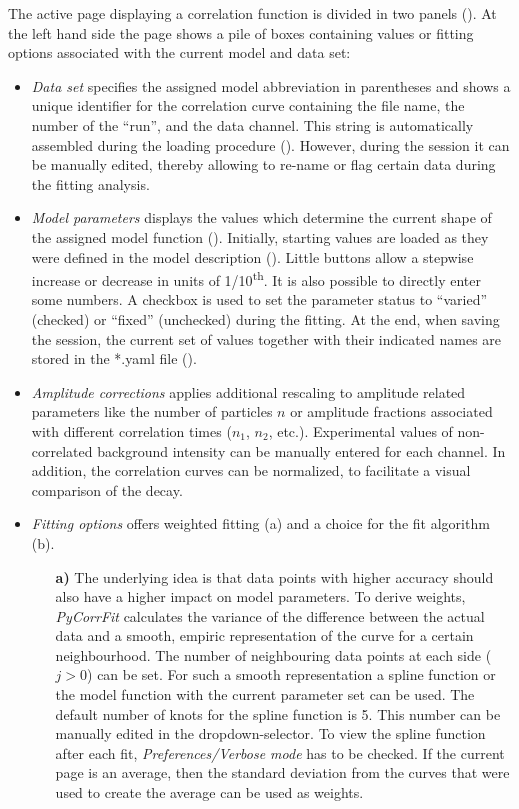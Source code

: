 The active page displaying a correlation function is divided in two panels (). At the left hand side the page shows a pile of boxes containing values or fitting options associated with the current model and data set: 

\begin{itemize}
\item \textit{Data set} specifies the assigned model abbreviation in parentheses and shows a unique identifier for the correlation curve containing the file name, the number of the ``run'', and the data channel. This string is automatically assembled during the loading procedure (). However, during the session it can be manually edited, thereby allowing to re-name or flag certain data during the fitting analysis.
\item \textit{Model parameters} displays the values which determine the current shape of the assigned model function (). Initially, starting values are loaded as they were defined in the model description (). Little buttons allow a stepwise increase or decrease in units of 1/10\textsuperscript{th}. It is also possible to directly enter some numbers. A checkbox is used to set the parameter status to ``varied'' (checked) or ``fixed'' (unchecked) during the fitting. At the end, when saving the session, the current set of values together with their indicated names are stored in the *.yaml file (). 
\item \textit{Amplitude corrections} applies additional rescaling to amplitude related parameters like the number of particles $n$ or amplitude fractions associated with different correlation times ($n_1$, $n_2$, etc.). Experimental values of non-correlated background intensity can be manually entered for each channel. In addition, the correlation curves can be normalized, to facilitate a visual comparison of the decay.
\item \textit{Fitting options} offers weighted fitting (a) and a choice for the fit algorithm (b).
\begin{itemize}
\item[\textbf{a)}] The underlying idea is that data points with higher accuracy should also have a higher impact on model parameters. To derive weights, \textit{PyCorrFit} calculates the variance of the difference between the actual data and a smooth, empiric representation of the curve for a certain neighbourhood. The number of neighbouring data points at each side ($j > 0$) can be set. For such a smooth representation a  spline function or the model function with the current parameter set can be used. The default number of knots for the spline function is 5. This number can be manually edited in the dropdown-selector. To view the spline function after each fit, \textit{Preferences/Verbose mode} has to be checked. If the current page is an average, then the standard deviation from the curves that were used to create the average can be used as weights.

\end{itemize}
\end{itemize}
